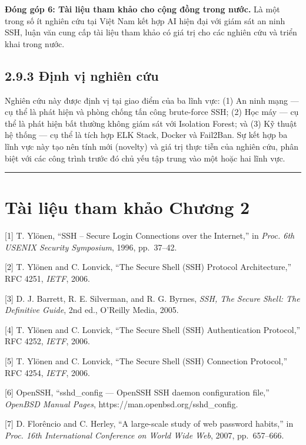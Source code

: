 \documentclass[
  a4paper]{report}
\begin{document}
\textbf{Đóng góp 6: Tài liệu tham khảo cho cộng đồng trong nước.} Là một
trong số ít nghiên cứu tại Việt Nam kết hợp AI hiện đại với giám sát an
ninh SSH, luận văn cung cấp tài liệu tham khảo có giá trị cho các nghiên
cứu và triển khai trong nước.

\subsection{2.9.3 Định vị nghiên
cứu}\label{ux111ux1ecbnh-vux1ecb-nghiuxean-cux1ee9u}

Nghiên cứu này được định vị tại giao điểm của ba lĩnh vực: (1) An ninh
mạng --- cụ thể là phát hiện và phòng chống tấn công brute-force SSH;
(2) Học máy --- cụ thể là phát hiện bất thường không giám sát với
Isolation Forest; và (3) Kỹ thuật hệ thống --- cụ thể là tích hợp ELK
Stack, Docker và Fail2Ban. Sự kết hợp ba lĩnh vực này tạo nên tính mới
(novelty) và giá trị thực tiễn của nghiên cứu, phân biệt với các công
trình trước đó chủ yếu tập trung vào một hoặc hai lĩnh vực.

\begin{center}\rule{0.5\linewidth}{0.5pt}\end{center}

\section{Tài liệu tham khảo Chương
2}\label{tuxe0i-liux1ec7u-tham-khux1ea3o-chux1b0ux1a1ng-2}

{[}1{]} T. Ylönen, ``SSH -- Secure Login Connections over the
Internet,'' in \emph{Proc. 6th USENIX Security Symposium}, 1996,
pp.~37--42.

{[}2{]} T. Ylönen and C. Lonvick, ``The Secure Shell (SSH) Protocol
Architecture,'' RFC 4251, \emph{IETF}, 2006.

{[}3{]} D. J. Barrett, R. E. Silverman, and R. G. Byrnes, \emph{SSH, The
Secure Shell: The Definitive Guide}, 2nd ed., O'Reilly Media, 2005.

{[}4{]} T. Ylönen and C. Lonvick, ``The Secure Shell (SSH)
Authentication Protocol,'' RFC 4252, \emph{IETF}, 2006.

{[}5{]} T. Ylönen and C. Lonvick, ``The Secure Shell (SSH) Connection
Protocol,'' RFC 4254, \emph{IETF}, 2006.

{[}6{]} OpenSSH, ``sshd\_config --- OpenSSH SSH daemon configuration
file,'' \emph{OpenBSD Manual Pages},
https://man.openbsd.org/sshd\_config.

{[}7{]} D. Florêncio and C. Herley, ``A large-scale study of web
password habits,'' in \emph{Proc. 16th International Conference on World
Wide Web}, 2007, pp.~657--666.
\end{document}
